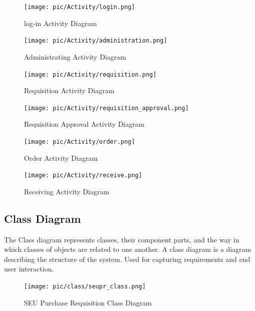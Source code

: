 \documentclass[12pt]{report} %
\begin{document}
\restoregeometry





\ifx

\begin{figure}[h]
	\texttt{[image: pic/Activity/login.png]}
	\caption{log-in Activity Diagram}
	\label{fig:login}
\end{figure}


\begin{figure}[h]
	\texttt{[image: pic/Activity/administration.png]}
	\caption{Administrating Activity Diagram}
	\label{fig:administration}
\end{figure}



\begin{figure}[h]
	\texttt{[image: pic/Activity/requisition.png]}
	\caption{Requisition Activity Diagram}
	\label{fig:requisition}
\end{figure}


\begin{figure}[h]
	\texttt{[image: pic/Activity/requisition\_approval.png]}
	\caption{Requisition Approval Activity Diagram}
	\label{fig:requisition_approval}
\end{figure}


\begin{figure}[h]
	\texttt{[image: pic/Activity/order.png]}
	\caption{Order Activity Diagram}
	\label{fig:order}
\end{figure}

\begin{figure}[h]
	\texttt{[image: pic/Activity/receive.png]}
	\caption{Receiving Activity Diagram}
	\label{fig:receive}
\end{figure}

\fi
\clearpage


\subsection{Class Diagram}
The Class diagram represents classes, their component parts, and the way in which classes of objects are related to one another. A class diagram is a diagram describing the structure of the system. Used for capturing requirements and end user interaction.\\

\begin{figure}[h]
	\texttt{[image: pic/class/seupr\_class.png]}
	\caption{SEU Purchase Requisition Class Diagram}
	\label{fig:Class_Diagram}
\end{figure}
\clearpage
\end{document}
